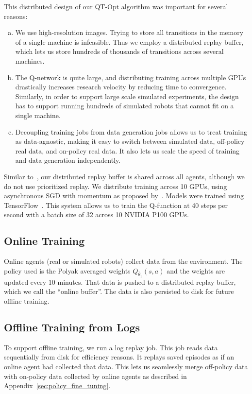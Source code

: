 \documentclass{article}
\begin{document}
This distributed design of our QT-Opt algorithm was important for several reasons:
\begin{enumerate}[(a)]
\item %
We use high-resolution images. Trying to store all transitions in the memory of a single machine is infeasible. Thus we employ a distributed replay buffer, which lets us store hundreds of thousands of transitions across several machines.
\item %
The Q-network is quite large, and distributing training across multiple GPUs drastically increases research velocity by reducing time to convergence. Similarly, in order to support large scale simulated experiments, the design has to support running hundreds of simulated robots that cannot fit on a single machine.
\item %
Decoupling training jobs from data generation jobs allows us to treat training as data-agnostic, making it easy to switch between simulated data, off-policy real data, and on-policy real data. It also lets us scale the speed of training and data generation independently.
\end{enumerate}

Similar to~\citep{horgan2018distributed}, our distributed replay buffer is shared across all agents, although we do not use prioritized replay.
We distribute training across 10 GPUs, using asynchronous SGD with momentum as proposed by~\citep{dean_async}. Models were trained using  TensorFlow~\citep{tensorflow2015-whitepaper}. This system allows us to train the Q-function at 40 steps per second with a batch size of 32 across 10 NVIDIA P100 GPUs.

\subsection{Online Training}\label{sec:online-training}

Online agents (real or simulated robots) collect data from the environment. The policy used is the Polyak averaged weights $Q_{\bar{\theta}_1}(s,a)$ and the weights are updated every 10 minutes. That data is pushed to a distributed replay buffer, which we call the \enquote{online buffer}. The data is also persisted to disk for future offline training.

\subsection{Offline Training from Logs}

To support offline training, we run a log replay job. This job reads data sequentially from disk for efficiency reasons. It replays saved episodes as if an online agent had collected that data. This lets us seamlessly merge off-policy data with on-policy data collected by online agents as described in Appendix~\ref{sec:policy_fine_tuning}.
\end{document}
